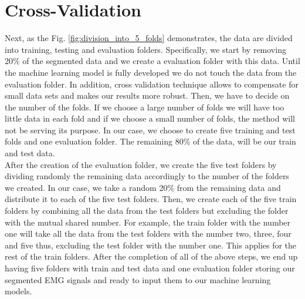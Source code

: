 \section{Cross-Validation}
Next, as the Fig. \ref{fig:division_into_5_folds} demonstrates, the data are divided into training, testing and evaluation folders. Specifically, we start by removing 20\% of the segmented data and we create a evaluation folder with this data. Until the machine learning model is fully developed we do not touch the data from the evaluation folder. In addition, cross validation technique allows to compensate for small data sets and makes our results more robust. Then, we have to decide on the number of the folds. If we choose a large number of folds we will have too little data in each fold and if we choose a small number of folds, the method will not be serving its purpose. In our case, we choose to create five training and test folds and one evaluation folder. The remaining 80\% of the data, will be our train and test data.\\
After the creation of the evaluation folder, we create the five test folders by dividing randomly the remaining data accordingly to the number of the folders we created. In our case, we take a random 20\% from the remaining data and distribute it to each of the five test folders. Then, we create each of the five train folders by combining all the data from the test folders but excluding the folder with the mutual shared number. For example, the train folder with the number one will take all the data from the test folders with the number two, three, four and five thus, excluding the test folder with the number one. This applies for the rest of the train folders. After the completion of all of the above steps, we end up having five folders with train and test data and one evaluation folder storing our segmented EMG signals and ready to input them to our machine learning models.
